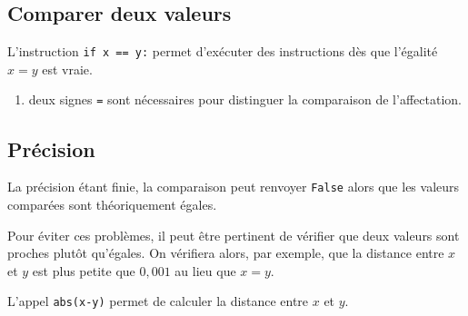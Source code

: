 
\subsection*{Comparer deux valeurs}


\begin{multicols}{2}
	L'instruction \texttt{if x == y:} permet d'exécuter des instructions dès que l'égalité $x=y$ est vraie.
	
	\begin{enumerate}[label=\warning]
		\item deux signes \texttt{=} sont nécessaires pour distinguer la comparaison de l'affectation.
	\end{enumerate}
	\centering
	\begin{minipage}{.1\textwidth}
	\end{minipage}
\end{multicols}


\subsection*{Précision}

\begin{multicols}{2}
	La précision étant finie, la comparaison peut renvoyer \texttt{False} alors que les valeurs comparées sont théoriquement égales.
	
	Pour éviter ces problèmes, il peut être pertinent de vérifier que deux valeurs sont proches plutôt qu'égales.
	On vérifiera alors, par exemple, que la distance entre $x$ et $y$ est plus petite que $0,001$ au lieu que $x = y$.
	
	L'appel \texttt{abs(x-y)} permet de calculer la distance entre $x$ et $y$.
	
	\centering
	\begin{minipage}{.2\textwidth}
	\end{minipage}
\end{multicols}

